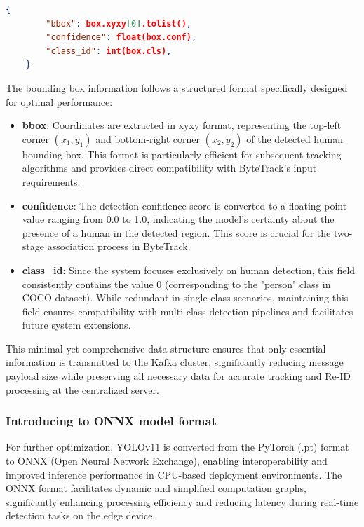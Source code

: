 \begin{lstlisting}[language=json, caption={Extracted bounding box information after inference}]
    {
        "bbox": box.xyxy[0].tolist(),
        "confidence": float(box.conf),
        "class_id": int(box.cls),
    }
\end{lstlisting}

The bounding box information follows a structured format specifically designed for optimal performance:

\begin{itemize}
    \item \textbf{bbox}: Coordinates are extracted in xyxy format, representing the top-left corner $(x_1, y_1)$ and bottom-right corner $(x_2, y_2)$ of the detected human bounding box. This format is particularly efficient for subsequent tracking algorithms and provides direct compatibility with ByteTrack's input requirements.
    
    \item \textbf{confidence}: The detection confidence score is converted to a floating-point value ranging from 0.0 to 1.0, indicating the model's certainty about the presence of a human in the detected region. This score is crucial for the two-stage association process in ByteTrack.
    
    \item \textbf{class\_id}: Since the system focuses exclusively on human detection, this field consistently contains the value 0 (corresponding to the "person" class in COCO dataset). While redundant in single-class scenarios, maintaining this field ensures compatibility with multi-class detection pipelines and facilitates future system extensions.
\end{itemize}

This minimal yet comprehensive data structure ensures that only essential information is transmitted to the Kafka cluster, significantly reducing message payload size while preserving all necessary data for accurate tracking and Re-ID processing at the centralized server.



\subsubsection{Introducing to ONNX model format}

For further optimization, YOLOv11 is converted from the PyTorch (.pt) format to ONNX (Open Neural Network Exchange), enabling interoperability and improved inference performance in CPU-based deployment environments. The ONNX format facilitates dynamic and simplified computation graphs, significantly enhancing processing efficiency and reducing latency during real-time detection tasks on the edge device.

